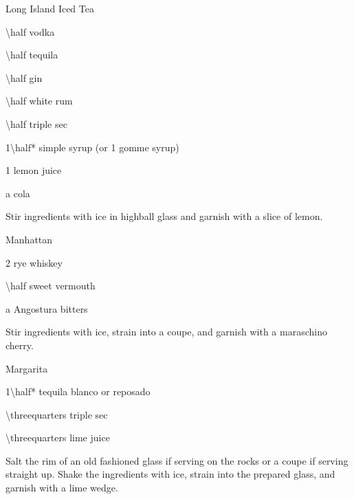 \begin{Cocktail}{Long Island Iced Tea}
	\begin{Ingredients}\normalsize
	\item \SI{\half}{\oz} vodka
	\item \SI{\half}{\oz} tequila
	\item \SI{\half}{\oz} gin
	\item \SI{\half}{\oz} white rum
	\item \SI{\half}{\oz} triple sec
	\item \SI{1\half*}{\oz} simple syrup (or \SI{1}{\oz} gomme syrup)
	\item \SI{1}{\oz} lemon juice
	\item a \si{\splash} cola
	\end{Ingredients}
	
	\begin{Instructions}\small
	Stir ingredients with ice in highball glass and garnish with a slice of lemon.
	\end{Instructions}
\end{Cocktail}

\begin{Cocktail}{Manhattan}
	\begin{Ingredients}
	\item \SI{2}{\oz} rye whiskey
	\item \SI{\half}{\oz} sweet vermouth
	\item a \si{\dash} Angostura bitters
	\end{Ingredients}
	
	\begin{Instructions}
	Stir ingredients with ice, strain into a coupe, and garnish with a maraschino cherry. 
	\end{Instructions}
\end{Cocktail}

\begin{Cocktail}{Margarita}
	\begin{Ingredients}
	\item \SI{1\half*}{\oz} tequila blanco or reposado
	\item \SI{\threequarters}{\oz} triple sec
	\item \SI{\threequarters}{\oz} lime juice
	\end{Ingredients}
	
	\begin{Instructions}
	Salt the rim of an old fashioned glass if serving on the rocks or a coupe if serving straight up.  Shake the ingredients with ice, strain into the prepared glass, and garnish with a lime wedge.
	\end{Instructions}
\end{Cocktail}


